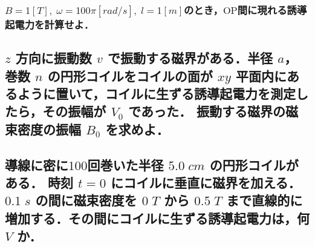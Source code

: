 \documentclass[a4paper, 12pt]{bxjsarticle}
\begin{document}
\subsubsection{\(B=1\si{[T]},\;\omega=100\pi\si{[rad/s]},\;l=1\si{[m]}\)のとき，\(\mathrm{OP}\)間に現れる誘導起電力を計算せよ．}
\vspace{15em}
\newpage
\begin{samepage}
\subsection{\(z\) 方向に振動数 \(v\) で振動する磁界がある．半径 \(a\)，巻数 \(n\) の円形コイルをコイルの面が \(xy\) 平面内にあるように置いて，コイルに生ずる誘導起電力を測定したら，その振幅が \(V_0\) であった．%
振動する磁界の磁束密度の振幅 \(B_0\) を求めよ．}
    \vspace{20em}
\subsection{導線に密に\(100\)回巻いた半径 \(5.0\;\si{cm}\) の円形コイルがある．%
時刻 \(t = 0\) にコイルに垂直に磁界を加える．\(0.1\;\si{s}\) の間に磁束密度を \(0\;\si{T}\) から%
 \(0.5\;\si{T}\) まで直線的に増加する．その間にコイルに生ずる誘導起電力は，何 \(\si{V}\) か．}
\end{samepage}
\end{document}
